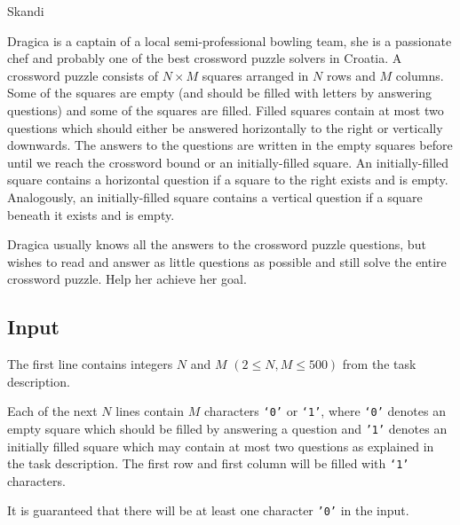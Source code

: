 \begin{statement}[
  problempoints=110,
  timelimit=10 seconds,
  memorylimit=512 MiB,
]{Skandi}


Dragica is a captain of a local semi-professional bowling team, she is a
passionate chef and probably one of the best crossword puzzle solvers in
Croatia. A crossword puzzle consists of $N \times M$ squares arranged in $N$
rows and $M$ columns. Some of the squares are empty (and should be filled
with letters by answering questions) and some of the squares are filled.
Filled squares contain at most two questions which should either be answered
horizontally to the right or vertically downwards. The answers to the
questions are written in the empty squares before until we reach the
crossword bound or an initially-filled square.  An initially-filled square
contains a horizontal question if a square to the right exists and is empty.
Analogously, an initially-filled square contains a vertical question if a
square beneath it exists and is empty.

Dragica usually knows all the answers to the crossword puzzle questions, but
wishes to read and answer as little questions as possible and still solve the
entire crossword puzzle. Help her achieve her goal.

\subsection*{Input}
The first line contains integers $N$ and $M$ $(2 \le N, M \le 500)$ from the
task description.

Each of the next $N$ lines contain $M$ characters \texttt{‘0’} or \texttt{‘1’},
where \texttt{‘0’} denotes an empty square which should be filled by
answering a question and \texttt{'1'} denotes an initially filled square
which may contain at most two questions as explained in the task description.
The first row and first column will be filled with \texttt{‘1’} characters.

It is guaranteed that there will be at least one character \texttt{'0'} in
the input.


\end{statement}
